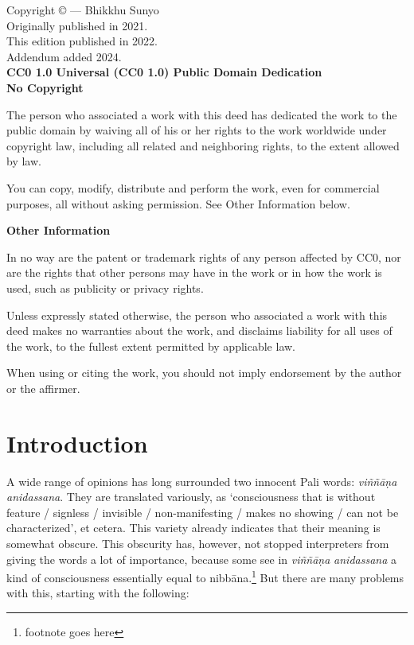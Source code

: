 \documentclass[10pt, openany]{book}
\begin{document}
\newpage
\begin{small}
\begin{sffamily}
\noindent Copyright © — Bhikkhu Sunyo\\

\noindent Originally published in 2021.\\\noindent This edition published in 2022.\\\noindent Addendum added 2024.\\

\noindent\textbf{CC0 1.0 Universal (CC0 1.0) Public Domain Dedication}\\



\noindent\textbf{No Copyright}

\noindent The person who associated a work with this deed has dedicated the work to the public domain by waiving all of his or her rights to the work worldwide under copyright law, including all related and neighboring rights, to the extent allowed by law.

\noindent You can copy, modify, distribute and perform the work, even for commercial purposes, all without asking permission. See Other Information below.


\noindent\textbf{Other Information}

\noindent In no way are the patent or trademark rights of any person affected by CC0, nor are the rights that other persons may have in the work or in how the work is used, such as publicity or privacy rights.

\noindent Unless expressly stated otherwise, the person who associated a work with this deed makes no warranties about the work, and disclaims liability for all uses of the work, to the fullest extent permitted by applicable law.

\noindent When using or citing the work, you should not imply endorsement by the author or the affirmer.

\end{sffamily}
\end{small}


\tableofcontents

\mainmatter
\pagestyle{fancy}

			
			
			

\chapter{Introduction}
A wide range of opinions has long surrounded two innocent Pali words: \textit{viññāṇa anidassana}. They are translated variously, as ‘consciousness that is without feature / signless / invisible / non-manifesting / makes no showing / can not be characterized’, et cetera. This variety already indicates that their meaning is somewhat obscure. This obscurity has, however, not stopped interpreters from giving the words a lot of importance, because some see in \textit{viññāṇa} \textit{anidassana} a kind of consciousness essentially equal to nibbāna.\footnote{footnote goes here} But there are many problems with this, starting with the following:
\end{document}
